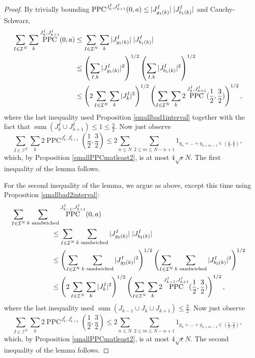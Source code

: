 \documentclass[12pt]{amsart}
\theoremstyle{definition}
\newcommand{\vs}{\vspace{3mm}}
\newcommand{\hs}{\hspace{1mm}}
\newcommand{\mc}{\mathcal}
\DeclareMathOperator{\PPC}{PPC}
\DeclareMathOperator{\summ}{sum}
\begin{document}
\begin{proof}
By trivially bounding $\PPC^{J_k^I,J_{k+1}^I}(0,a) \le |J_{g_1(k)}^I|\hs |J_{b_1(k)}^I|$ and Cauchy-Schwarz, \begin{align*} \sum_{I \in \mc{I}^N} \sum_k \PPC^{J_k^I,J_{k+1}^I}(0,a) &\le \sum_{I \in \mc{I}^N} \sum_k |J_{g_1(k)}^I|\hs |J_{b_1(k)}^I| \\ &\le \left(\sum_{I,k} |J_{g_1(k)}^I|^2\right)^{1/2}\left(\sum_{I,k} |J_{b_1(k)}^I|^2\right)^{1/2} \\ &\le \left(2\sum_{I \in \mc{I}^N} \sum_k |J_k^I|^2\right)^{1/2}\left(\sum_{I \in \mc{I}^N} \sum_k 2 \PPC^{J_k^I,J_{k+1}^I}(\frac{1}{2},\frac{3}{2})\right)^{1/2},\end{align*} where the last inequality used Proposition \ref{smallbad1interval} together with the fact that $\summ(J_k^I \cup J_{k+1}^I) \le 1 \le \frac{3}{2}$. Now just observe $$\sum_{I \in \mc{I}^N} \sum_k 2 \PPC^{J_k^I,J_{k+1}^I}(\frac{1}{2},\frac{3}{2}) \le 2\sum_{n \le N} \sum_{2 \le m \le N-n+1} 1_{g_n+\dots+g_{n+m-1} \in (\frac{1}{2},\frac{3}{2})},$$ which, by Proposition \ref{smallPPCmatleast2}, is at most $4\sqrt{\epsilon} N$. The first inequality of the lemma follows. 

\vs

For the second inequality of the lemma, we argue as above, except this time using Proposition \ref{smallbad2interval}: \begin{align*} &\sum_{I \in \mc{I}^N} \sum_{k \text{ sandwiched}} \PPC^{J_{k-1}^I,J_{k+1}^I}(0,a)\\ &\qquad \qquad \qquad \le \sum_{I \in \mc{I}^N} \sum_{k \text{ sandwiched}} |J_{g_2(k)}^I|\hs |J_{b_2(k)}^I| \\ &\qquad \qquad \qquad \le \left(\sum_{I \in \mc{I}^N} \sum_{k \text{ sandwiched}} |J_{g_2(k)}^I|^2\right)^{1/2}\left(\sum_{I \in \mc{I}^N} \sum_{k \text{ sandwiched}} |J_{b_2(k)}^I|^2\right)^{1/2} \\ &\qquad \qquad \qquad \le \left(2\sum_{I \in \mc{I}^N} \sum_k |J_k^I|^2\right)^{1/2}\left(\sum_{I \in \mc{I}^N} \sum_k 2 \PPC^{J_{k-1}^I,J_{k+1}^I}(\frac{1}{2},\frac{3}{2})\right)^{1/2},\end{align*} where the last inequality used $\summ(J_{k-1}\cup J_k\cup J_{k+1}) \le \frac{3}{2}$. Now just observe $$\sum_{I \in \mc{I}^N} \sum_k 2 \PPC^{J_k^I,J_{k+1}^I}(\frac{1}{2},\frac{3}{2}) \le 2\sum_{n \le N} \sum_{2 \le m \le N-n+1} 1_{g_n+\dots+g_{n+m-1} \in (\frac{1}{2},\frac{3}{2})},$$ which, by Proposition \ref{smallPPCmatleast2}, is at most $4\sqrt{\epsilon} N$. The second inequality of the lemma follows.
\end{proof}
\end{document}
